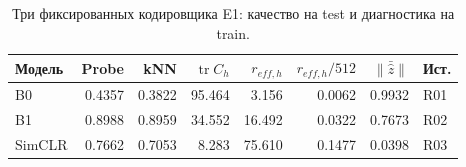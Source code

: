 \begin{table}[H]\centering\footnotesize
\setlength{\tabcolsep}{4pt}
\caption{Три фиксированных кодировщика E1: качество на test и диагностика на train.}\label{tab:e1}
\begin{tabular}{lrrrrrrl}
\toprule
Модель & Probe & kNN & $\operatorname{tr}C_h$ & $r_{eff,h}$ & $r_{eff,h}/512$ & $\|\bar{\hat z}\|$ & Ист. \\
\midrule
B0 & 0.4357 & 0.3822 & 95.464 & 3.156 & 0.0062 & 0.9932 & R01 \\
B1 & 0.8988 & 0.8959 & 34.552 & 16.492 & 0.0322 & 0.7673 & R02 \\
SimCLR & 0.7662 & 0.7053 & 8.283 & 75.610 & 0.1477 & 0.0398 & R03 \\
\bottomrule
\end{tabular}
\end{table}
